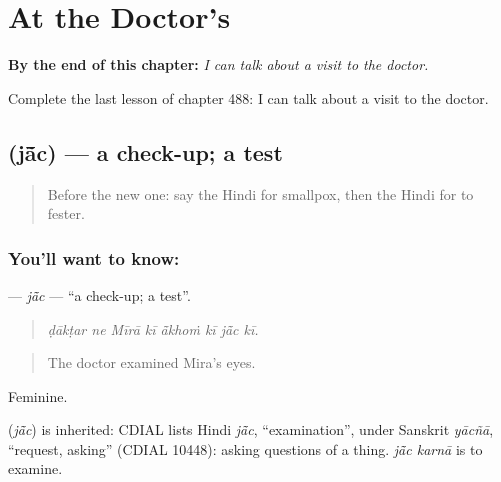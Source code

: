 
\chapter{At the Doctor's}
\label{ch:hi-at-the-doctor-s}

\begin{chapteropening}
\textbf{By the end of this chapter:} \emph{I can talk about a visit to the doctor.}

Complete the last lesson of chapter 488: I can talk about a visit to the doctor.
\end{chapteropening}

\section[\texorpdfstring{\hi{जाँच} (jā̃c)}{जाँच (jā̃c)}]{ (jā̃c) — a check-up; a test}

\label{lesson:HI-C488-jac}



\begin{quote}
Before the new one: say the Hindi for smallpox, then the Hindi for to fester.
\end{quote}

\subsection*{You'll want to know: }
\textbf{} — \emph{jā̃c} — \textquotedblleft{}a check-up; a test\textquotedblright{}.

\begin{quote}
       
\end{quote}

\begin{quote}
\emph{ḍākṭar ne Mīrā kī ā̃khoṁ kī jā̃c kī.}
\end{quote}

\begin{quote}
The doctor examined Mira's eyes.
\end{quote}

Feminine.

\begin{cousinweb}
\textbf{} (\emph{jā̃c}) is inherited: CDIAL lists Hindi \emph{jā̃c}, \textquotedblleft{}examination\textquotedblright{}, under Sanskrit \emph{yācñā}, \textquotedblleft{}request, asking\textquotedblright{} (CDIAL 10448): asking questions of a thing. \emph{jā̃c karnā} is to examine.
\end{cousinweb}

